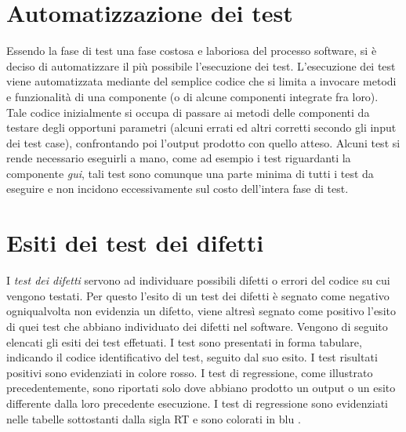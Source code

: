 \section{Automatizzazione dei test}
Essendo la fase di test una fase costosa e laboriosa del processo software, si \`e deciso di automatizzare il pi\`u possibile l'esecuzione dei test. L'esecuzione dei test viene automatizzata mediante del semplice codice che si limita a invocare metodi e funzionalit\`a di una componente (o di alcune componenti integrate fra loro). Tale codice inizialmente si occupa di passare ai metodi delle componenti da testare degli opportuni parametri (alcuni errati ed altri corretti secondo gli input dei test case), confrontando poi l'output prodotto con quello atteso.
Alcuni test si rende necessario eseguirli a mano, come ad esempio i test riguardanti la componente \textit{gui}, tali test sono comunque una parte minima di tutti i test da eseguire e non incidono eccessivamente sul costo dell'intera fase di test.

\section{Esiti dei test dei difetti}
I \textit{test dei difetti} servono ad individuare possibili difetti o errori del codice su cui vengono testati. Per questo l'esito di un test dei difetti \`e segnato come negativo ogniqualvolta non evidenzia un difetto, viene altres\`i segnato come positivo l'esito di quei test che abbiano individuato dei difetti nel software.
Vengono di seguito elencati gli esiti dei test effetuati. I test  sono presentati in forma tabulare, indicando il codice identificativo del test, seguito dal suo esito. I test risultati positivi sono evidenziati in colore \textcolor{err}{rosso}. I test di regressione, come illustrato precedentemente, sono riportati solo dove abbiano prodotto un output o un esito differente dalla loro precedente esecuzione. I test di regressione sono evidenziati nelle tabelle sottostanti dalla sigla RT e sono colorati in \textcolor{rt}{blu} .


